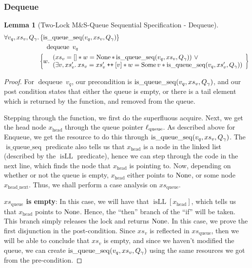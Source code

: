 \documentclass[a4paper, 10pt]{report}
\theoremstyle{definition}
\newtheorem{lemma}[theorem]{Lemma}
\newcommand{\dequeue}{\operatorname{dequeue}}
\newcommand{\msq}{M\&S-Queue\xspace}
\newcommand{\tlmsq}{Two-Lock \msq}
\newcommand{\isqueueseq}{\operatorname{is\_queue\_seq}}
\newcommand{\vq}{v_q}
\newcommand{\xsqueue}{xs_{\mathrm{queue}}}
\newcommand{\isLL}{\operatorname{isLL}}
\newcommand{\locN}[1]{\loc_{\mathrm{#1}}}
\newcommand{\locqueue}{\locN{queue}}
\newcommand{\nodeval}{\valB}
\newcommand{\node}{x}
\newcommand{\nodeN}[1]{\node_{\mathrm{#1}}}
\newcommand{\nodehead}{\nodeN{head}}
\newcommand{\nodeheadnext}{\nodeN{head\_next}}
\newcommand{\absvalue}{\val}
\newcommand{\absvalueList}{xs_v}
\newcommand{\Qg}{Q_\gname}
\newcommand\catenate{\mathbin{\text{\ttfamily\upshape ++}}}
\newcommand{\tlseqspecdeq}{\All \vq, \absvalueList, \Qg. \hoareV[t]{\isqueueseq(\vq, \absvalueList, \Qg)}{\dequeue \ \vq}{\nodeval . \begin{array}{l}(\absvalueList = [] \star \nodeval = \None \star \isqueueseq(\vq, \absvalueList, \Qg)) ~ \lor\\ (\Exists \absvalue, \absvalueList' . \absvalueList = \absvalueList' \catenate [\absvalue] \star \nodeval = \Some \absvalue \star \isqueueseq(\vq, \absvalueList', \Qg)) \end{array}}}
\begin{document}
\subsubsection{Dequeue}
\begin{lemma}[\tlmsq Sequential Specification - Dequeue]\label{TLMSQ:spec:seq:dequeue}
  \begin{equation*}
    \tlseqspecdeq
  \end{equation*}
\end{lemma}
\begin{proof}
For $\dequeue \ \vq$, our precondition is $\isqueueseq(\vq, \absvalueList, \Qg)$, and our post condition states that either the queue is empty, or there is a tail element which is returned by the function, and removed from the queue.

Stepping through the function, we first do the superfluous acquire. Next, we get the head node $\nodehead$ through the queue pointer $\locqueue$. As described above for Enqueue, we get the resource to do this through $\isqueueseq(\vq, \absvalueList, \Qg)$. The $\isqueueseq$ predicate also tells us that $\nodehead$ is a node in the linked list (described by the $\isLL$ predicate), hence we can step through the code in the next line, which finds the node that $\nodehead$ is pointing to. Now, depending on whether or not the queue is empty, $\nodehead$ either points to $\operatorname{None}$, or some node $\nodeheadnext$. Thus, we shall perform a case analysis on $\xsqueue$.

\textbf{$\xsqueue$ is empty}: In this case, we will have that $\isLL [\nodehead]$, which tells us that $\nodehead$ points to $\operatorname{None}$. Hence, the ``then'' branch of the ``if'' will be taken. This branch simply releases the lock and returns $\operatorname{None}$. In this case, we prove the first disjunction in the post-condition. Since $\absvalueList$ is reflected in $\xsqueue$, then we will be able to conclude that $\absvalueList$ is empty, and since we haven't modified the queue, we can create $\isqueueseq(\vq, \absvalueList, \Qg)$ using the same resources we got from the pre-condition.


\end{proof}
\end{document}
